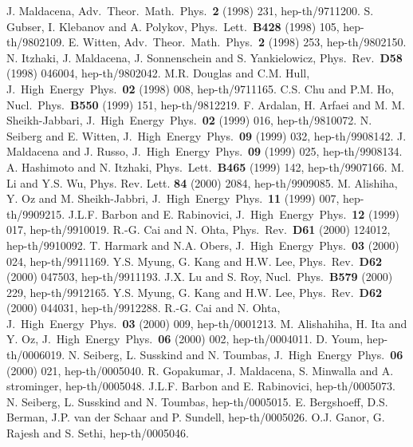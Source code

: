 \documentclass[a4paper,12pt]{article}
\begin{document}
\newcommand{\ATMP}[1]{Adv.\ Theor.\ Math.\ Phys.\ {\bf #1}}
\newcommand{\NP}[1]{Nucl.\ Phys.\ {\bf #1}}
\newcommand{\PL}[1]{Phys.\ Lett.\ {\bf #1}}
\newcommand{\PR}[1]{Phys.\ Rev.\ {\bf #1}}
\newcommand{\IJMP}[1]{Int.\ Jour.\ Mod.\ Phys.\ {\bf #1}}
\newcommand{\JHEP}[1]{J.\ High\ Energy\ Phys.\ {\bf #1}}
\begin{thebibliography}{99}
 J. Maldacena, \ATMP{2} (1998) 231, hep-th/9711200.
 S. Gubser, I. Klebanov and A. Polykov, \PL{B428}
 (1998) 105, hep-th/9802109.
 E. Witten, \ATMP{2} (1998) 253, hep-th/9802150.
 N. Itzhaki, J. Maldacena, J. Sonnenschein and
 S. Yankielowicz, \PR{D58} (1998) 046004, hep-th/9802042.
 M.R. Douglas and C.M. Hull, \JHEP{02} (1998) 008,
 hep-th/9711165.
 C.S. Chu and P.M. Ho, \NP{B550} (1999) 151, hep-th/9812219.
 F. Ardalan, H. Arfaei and M. M. Sheikh-Jabbari,
 \JHEP{02} (1999) 016, hep-th/9810072.
 N. Seiberg and E. Witten, \JHEP{09} (1999) 032, hep-th/9908142.
 J. Maldacena and J. Russo, \JHEP{09} (1999) 025,
 hep-th/9908134.
 A. Hashimoto and N. Itzhaki, \PL{B465} (1999) 142,
 hep-th/9907166.
 M. Li and Y.S. Wu, Phys. Rev. Lett. {\bf 84} (2000) 2084,
 hep-th/9909085.
 M. Alishiha, Y. Oz and M. Sheikh-Jabbri, \JHEP{11}
 (1999) 007, hep-th/9909215.
 J.L.F. Barbon and E. Rabinovici, \JHEP{12}
 (1999) 017, hep-th/9910019.
 R.-G. Cai and N. Ohta, \PR{D61} (2000) 124012, hep-th/9910092.
 T. Harmark and N.A. Obers, \JHEP{03} (2000) 024, hep-th/9911169.
 Y.S. Myung, G. Kang and H.W. Lee, \PR{D62} (2000)
  047503, hep-th/9911193.
 J.X. Lu and S. Roy, \NP{B579} (2000) 229, hep-th/9912165.
 Y.S. Myung, G. Kang and H.W. Lee, \PR{D62}
 (2000) 044031, hep-th/9912288.
 R.-G. Cai and N. Ohta, \JHEP{03} (2000) 009, hep-th/0001213.
 M. Alishahiha, H. Ita and Y. Oz, \JHEP{06} (2000) 002,
 hep-th/0004011.
 D. Youm, hep-th/0006019.
 N. Seiberg, L. Susskind and N. Toumbas, \JHEP{06} (2000) 021,
 hep-th/0005040.
 R. Gopakumar, J. Maldacena, S. Minwalla and A. strominger,
 hep-th/0005048.
 J.L.F. Barbon and E. Rabinovici, hep-th/0005073.
 N. Seiberg, L. Susskind and N. Toumbas, hep-th/0005015.
 E. Bergshoeff, D.S. Berman, J.P. van der Schaar and P.
 Sundell, hep-th/0005026.
 O.J. Ganor, G. Rajesh and S. Sethi, hep-th/0005046.

\end{thebibliography}
\end{document}
